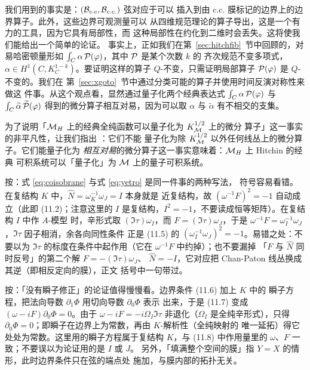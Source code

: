 我们用到的事实是：$({\cal B}_{c.c},{\cal B}_{c.c.})$ 弦对应于可以
插入到由 c.c. 膜标记的边界上的边界算子。此外，这些边界可观测量可以
从四维规范理论的算子导出，这是一个有力的工具，因为它具有局部性，而
这种局部性在约化到二维时会丢失。这将使我们能给出一个简单的论证。
事实上，正如我们在第~\ref{sec:hitchfib}~节中回顾的，对易哈密顿量形如
$\int_C \alpha\,{\cal P}(\varphi)$，其中 ${\cal P}$ 是某个次数 $k$ 的
齐次规范不变多项式，$\alpha\in H^1(C,K_C^{1-k})$。要证明这样的算子
$Q$-不变，只需证明局部算子 ${\cal P}(\varphi)$ 是 $Q$-不变的。我们在
第~\ref{sec:xgoto}~节中通过分类可能的算子并使用时间反演对称性来做这
件事。从这个观点看，显然通过量子化两个经典表达式
$\int_C \alpha \,{\cal P}(\varphi)$ 与 $\int_C\tilde
\alpha \,\tilde {\cal P}(\varphi)$ 得到的微分算子相互对易，因为可以取
$\alpha$ 与 $\tilde\alpha$ 有不相交的支集。

为了说明「$\MH$ 上的经典全纯函数可以量子化为 $K_\M^{1/2}$ 上的微分
算子」这一事实的非平凡性，让我们指出 \cite{ref141,ref5}：它们不能
量子化为除 $K_\cM^{1/2}$ 以外任何线丛上的微分算子。它们能量子化为
\emph{相互对易}的微分算子这一事实意味着：$\MH$ 上 Hitchin 的经典
可积系统可以「量子化」为 $\M$ 上的量子可积系统。

\begin{yizhu}[易错点]
按：式 \eqref{eq:coisobrane} 与式 \eqref{eq:yetro} 是同一件事的两种写法，
符号容易看错。在复结构 $K$ 中，$\hat N=\omega_K^{-1}\omega_J=I$ 本身就是
近复结构，故 $(\omega^{-1}F)^2=-1$ 自动成立（此即 (11.2)；注意这里的
$I$ 是复结构，$I^2=-1$，不要读成恒等矩阵）。在复结构 $I$ 中作 $A$-模型
时，辛形式取 $(\Im\tau)\omega_I$，而 $F=(\Im\tau)\omega_J$，于是
$\omega^{-1}F=\omega_I^{-1}\omega_J$，$\Im\tau$ 因子相消，余各向同性条件
正是 (11.5) 的 $(\omega_I^{-1}\omega_J)^2=-1$。易错之处：不要以为
$\Im\tau$ 的标度在条件中起作用（它在 $\omega^{-1}F$ 中约掉）；也不要漏掉
「$F$ 与 $\hat N$ 同时反号」的第二个解 $F=-(\Im\tau)\omega_J$、
$\hat N=-I$，它对应把 Chan-Paton 线丛换成其逆（即相反定向的膜），正文
括号中一句带过。
\end{yizhu}

\begin{yizhu}[含糊点拨]
按：「没有瞬子修正」的论证值得慢慢看。边界条件 (11.6) 加上 $K$ 中的
瞬子方程，把法向导数 $\partial_1\Phi$ 用切向导数 $\partial_0\Phi$ 表示
出来，于是 (11.7) 变成 $(\omega-iF)\partial_0\Phi=0$。由于
$\omega-iF=-i\Omega_I\Im\tau$ 非退化（$\Omega_I$ 是全纯辛形式），只得
$\partial_0\Phi=0$；即瞬子在边界上为常数，再由 $K$-解析性（全纯映射的
唯一延拓）得它处处为常数。这里用的瞬子方程属于复结构 $K$，与 (11.8)
中作用量里的 $\omega$、$F$ 一致；不要误以为论证用的是 $I$ 或 $J$。
另外，「填满整个空间的膜」指 $Y=X$ 的情形，此时边界条件只在弦的端点处
施加，与膜内部的拓扑无关。
\end{yizhu}

